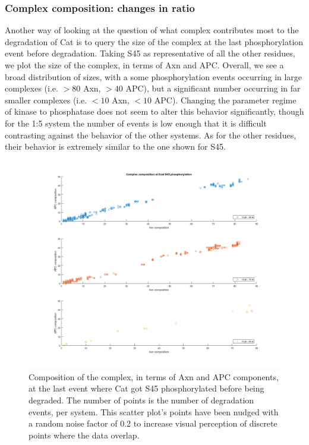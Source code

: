 \subsubsection*{Complex composition: changes in ratio}

Another way of looking at the question of what complex contributes
most to the degradation of Cat is to query the size of the complex at
the last phosphorylation event before degradation. Taking S45 as
representative of all the other residues, we plot the size of the
complex, in terms of Axn and APC. Overall, we see a broad distribution
of sizes, with a some phosphorylation events occurring in large
complexes (i.e. $>80$ Axn, $>40$ APC), but a significant number occurring
in far smaller complexes (i.e. $<10$ Axn, $<10$ APC). Changing the
parameter regime of kinase to phosphatase does not seem to alter this
behavior significantly, though for the 1:5 system the number of events
is low enough that it is difficult contrasting against the behavior of
the other systems. As for the other residues, their behavior is
extremely similar to the one shown for S45.

\begin{figure}[p]
  \centering
  \includegraphics[scale=0.35]{wnt/F6_complex_composition_final_S45}
  \caption{Composition of the complex, in terms of Axn and APC
    components, at the last event where Cat got S45 phosphorylated
    before being degraded. The number of points is the number of
    degradation events, per system. This scatter plot’s points have
    been nudged with a random noise factor of 0.2 to increase visual
    perception of discrete points where the data overlap.}
  \label{F6}
\end{figure}


